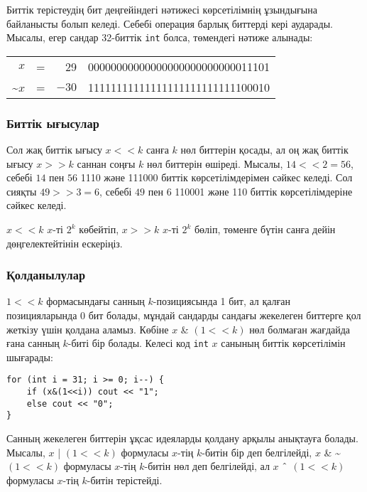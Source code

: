 Биттік терістеудің бит деңгейіндегі нәтижесі 
көрсетілімнің ұзындығына байланысты болып келеді.
Себебі операция барлық биттерді кері аударады.
Мысалы, егер сандар 32-биттік \texttt{int} болса, 
төмендегі нәтиже алынады:

\begin{center}
\begin{tabular}{rrrr}
$x$ & = & 29 &   00000000000000000000000000011101 \\
\textasciitilde$x$ & = & $-30$ & 11111111111111111111111111100010 \\
\end{tabular}
\end{center}

\subsubsection{Биттік ығысулар}


Сол жақ биттік ығысу $x < < k$ санға $k$
нөл биттерін қосады, ал оң жақ биттік ығысу 
$x > > k$ саннан соңғы $k$ нөл биттерін өшіреді.
Мысалы, $14 < < 2 = 56$, себебі $14$ пен $56$ 1110 және 111000
биттік көрсетілімдерімен сәйкес келеді. Сол сияқты $49 > > 3 = 6$,
себебі $49$ пен $6$ 110001 және 110 биттік көрсетілімдеріне сәйкес келеді.

$x < < k$ $x$-ті $2^k$ көбейтіп, $x > > k$ $x$-ті
$2^k$ бөліп, төменге бүтін санға дейін 
дөңгелектейтінін ескеріңіз.

\subsubsection{Қолданылулар}

$1 < < k$ формасындағы санның $k$-позициясында 1 бит, ал қалған 
позицияларында 0 бит болады, мұндай сандарды сандағы жекелеген 
биттерге қол жеткізу үшін қолдана аламыз.
Көбіне $x$ \& $(1 < < k)$ нөл болмаған жағдайда ғана санның $k$-биті бір болады.
Келесі код \texttt{int} $x$ санының биттік көрсетілімін шығарады:

\begin{lstlisting}
for (int i = 31; i >= 0; i--) {
    if (x&(1<<i)) cout << "1";
    else cout << "0";
}
\end{lstlisting}

Санның жекелеген биттерін ұқсас идеяларды қолдану арқылы
анықтауға болады. Мысалы, $x$ | $(1 < < k)$ формуласы $x$-тің 
$k$-битін бір деп белгілейді, $x$ \& \textasciitilde $(1 < < k)$
формуласы $x$-тің $k$-битін нөл деп белгілейді, ал $x$ $\XOR$ $(1 < < k)$
формуласы $x$-тің $k$-битін терістейді.

